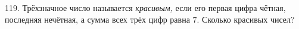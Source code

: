 119. Трёхзначное число называется {\it красивым,} если его первая цифра чётная, последняя нечётная, а сумма всех трёх цифр равна 7. Сколько красивых чисел?\\
